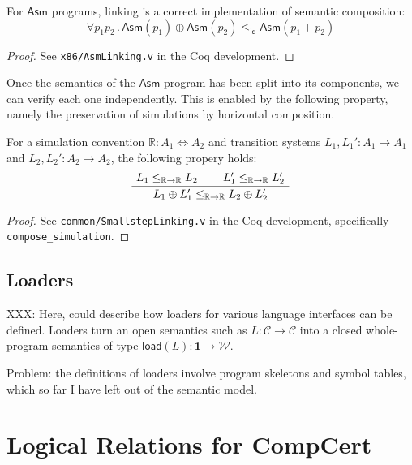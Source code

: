 \documentclass[sigplan,10pt,review,anonymous]{acmart}
\newcommand{\kw}[1]{\ensuremath{ \mathsf{#1} }}
\begin{document}
\begin{theorem} \label{thm:asmlinking} %
For \kw{Asm} programs,
linking is a correct implementation of
semantic composition:
\[
    \forall p_1 p_2 \,.\,
      \kw{Asm}(p_1) \oplus \kw{Asm}(p_2)
      \le_\kw{id}
      \kw{Asm}(p_1 + p_2)
\]
\begin{proof}
See \texttt{x86/AsmLinking.v} in the Coq development.
\end{proof}
\end{theorem}

Once the semantics of the \kw{Asm} program
has been split into its components,
we can verify each one independently.
This is enabled by the following property,
namely the preservation of simulations by
horizontal composition.

\begin{theorem} \label{thm:simlinking} %
For a simulation convention
$\mathbb{R} : A_1 \Leftrightarrow A_2$
and transition systems
$L_1, L_1' : A_1 \rightarrow A_1$ and
$L_2, L_2' : A_2 \rightarrow A_2$,
the following propery holds:
\[
    \AxiomC{$L_1 \le_{\mathbb{R} \rightarrow \mathbb{R}} L_2$}
    \AxiomC{$L_1' \le_{\mathbb{R} \rightarrow \mathbb{R}} L_2'$}
    \BinaryInfC{$L_1 \oplus L_1' \le_{\mathbb{R} \rightarrow \mathbb{R}} L_2 \oplus L_2'$}
    \DisplayProof
\]
\begin{proof}
See \texttt{common/SmallstepLinking.v}
in the Coq development,
specifically \texttt{compose\_simulation}.
\end{proof}
\end{theorem}


\subsection{Loaders} \label{sec:sem:loader} %

XXX: Here, could describe how loaders for various language
interfaces can be defined.
Loaders turn an open semantics such as
$L : \mathcal{C} \rightarrow \mathcal{C}$
into a closed whole-program semantics of type
$\kw{load}(L) : \mathbf{1} \rightarrow \mathcal{W}$.

Problem: the definitions of loaders involve
program skeletons and symbol tables,
which so far I have left out of the semantic model.



\section{Logical Relations for CompCert} \label{sec:cklr} %
\end{document}
